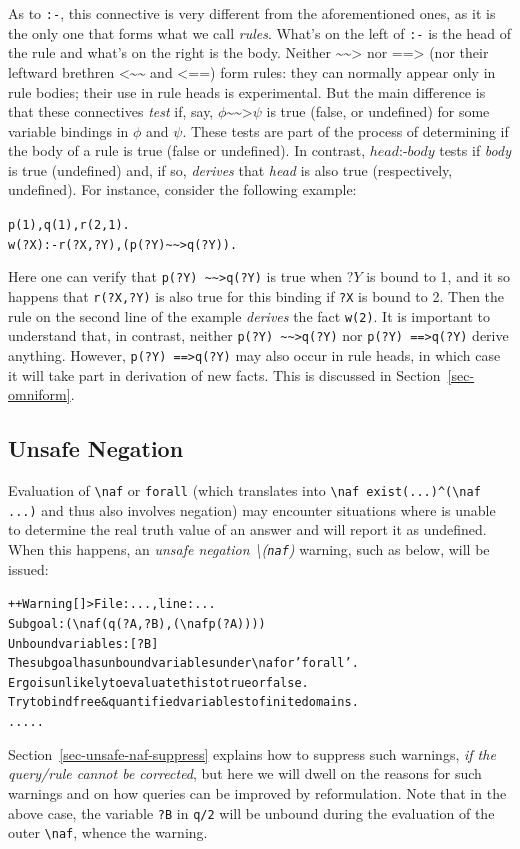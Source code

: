 \documentclass[11pt]{article}
\newcommand{\ERGO}{\mbox{\smaller{\ensuremath{\cal{E}}\smaller{{\sc{RGO}}}}}\xspace}
\newcommand{\FLSYSTEM}{\ERGO}
\newcommand{\rnafarr}{\texttt{\textasciitilde\textasciitilde>}}
\newcommand{\lnafarr}{\texttt{<\textasciitilde\textasciitilde}}
\newcommand{\rnegarr}{\texttt{==>}}
\newcommand{\lnegarr}{\texttt{<==}}
\newcommand{\bs}{\textbackslash}
\begin{document}
As to \texttt{:-}, this connective is very different from the
aforementioned ones, as it is the only one that forms what we call
\emph{rules}. What's on the left of \texttt{:-} is the head of the rule and
what's on the right is the body. Neither  $\rnafarr $ nor $\rnegarr $ (nor
their leftward brethren $\lnafarr$ and $\lnegarr$)
form rules: they can normally appear only in rule bodies; their use in rule
heads is experimental.
But the main difference is
that these connectives \emph{test} if, say, $\phi \rnafarr
\psi$ is true (false, or undefined) for some variable bindings in $\phi$ and
$\psi$. These tests are part
of the process of determining if the body of a rule is true (false or
undefined).
In contrast, $head \texttt{:-} body$ tests if \textit{body} is true (undefined) and, if so, \emph{derives} that \emph{head} is also true (respectively,
undefined). For instance, consider the following example:
\begin{alltt}
   p(1), q(1), r(2,1).
   w(?X) :- r(?X,?Y), (p(?Y) \rnafarr q(?Y)).
\end{alltt}
Here one can verify that \texttt{p(?Y) \rnafarr q(?Y)} is true when $?Y$
is bound to 1, and it so happens that \texttt{r(?X,?Y)} is also true for
this binding if \texttt{?X} is bound to 2. Then the rule on the second
line of the example \emph{derives} the fact \texttt{w(2)}.
It is important
to understand that, in contrast, neither \texttt{p(?Y) \rnafarr q(?Y)} nor
\texttt{p(?Y) \rnegarr q(?Y)}  derive anything.
However, \texttt{p(?Y) \rnegarr q(?Y)} may also occur in rule heads,
in which case it will take part in derivation of new facts. This is
discussed in Section~\ref{sec-omniform}.

\subsection{Unsafe Negation} \label{sec-unsafe-negation}

\index{\bs{}naf!unsafe}
\index{unsafe \bs{}naf}
Evaluation of \texttt{\bs{}naf} or \texttt{forall}  (which translates into
\verb|\naf exist(...)^(\naf ...)| and thus also involves negation)
may encounter situations where \FLSYSTEM is
unable to determine the real truth value of an answer and will report it as
undefined. When this happens, an
\emph{unsafe negation \bs{}(\texttt{naf})} warning,
such as below, will be issued:
\begin{alltt}
  ++Warning[\FLSYSTEM]> File: ..., line: ...
		   Subgoal: (\bs{}naf (q(?A,?B), (\bs{}naf p(?A))))
		   Unbound variables: [?B]
		   The subgoal has unbound variables under \bs{}naf or 'forall'.
		   Ergo is unlikely to evaluate this to true or false.
		   Try to bind free & quantified variables to finite domains.
                   .....

\end{alltt}
Section~\ref{sec-unsafe-naf-suppress} explains how to suppress such warnings,
\emph{if the query/rule cannot be corrected}, but here we will dwell on the
reasons for such warnings and on how queries can be improved by
reformulation.
Note that in
the above case, the variable \texttt{?B} in \texttt{q/2} will be unbound
during the evaluation of the outer \texttt{\bs{}naf}, whence the warning. 
\end{document}
